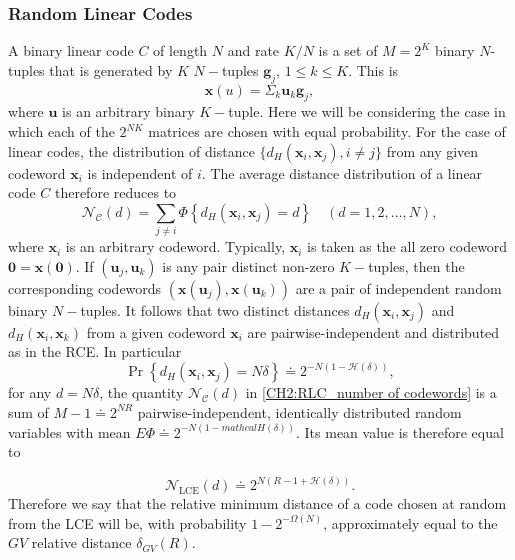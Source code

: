 \subsubsection{Random Linear Codes}
A binary linear code $C$ of length $N$ and rate $K/N$ is a set of $M=2^K$ binary $N$-tuples that is generated by $K$ $N-$tuples $\mathbf{g}_j$, $1\leq k \leq K$. This is
\begin{equation}
\mathbf{x}(u)=\Sigma_k \mathbf{u}_k \mathbf{g}_j,
\end{equation}
where $\mathbf{u}$ is an arbitrary binary $K-$tuple. Here we will be considering the case in which each of the $2^{NK}$ matrices are chosen with equal probability. For the case of linear codes, the distribution of distance $\{d_H(\mathbf{x}_i,\mathbf{x}_j),i\neq j\}$ from any given codeword $\mathbf{x}_i$ is independent of $i$. The average distance distribution of a linear code $C$ therefore reduces to
\begin{equation}
\mathcal{N}_{\mathcal{C}}(d)=\sum_{j \neq i} \Phi\left\{d_{H}\left(\boldsymbol{x}_{i}, \boldsymbol{x}_{j}\right)=d\right\} \quad(d=1,2, \ldots, N),
\label{CH2:RLC_number of codewords}
\end{equation}
where $\mathbf{x}_i$ is an arbitrary codeword. Typically, $\mathbf{x}_i$ is taken as the all zero codeword $\mathbf{0}=\mathbf{x(0)}$. If $(\mathbf{u}_j,\mathbf{u}_k)$ is any pair distinct non-zero $K-$tuples, then the corresponding codewords $(\mathbf{x}(\mathbf{u}_j),\mathbf{x}(\mathbf{u}_k))$ are a pair of independent random binary $N-$tuples. It follows that two distinct distances $d_H(\mathbf{x}_i,\mathbf{x}_j)$ and $d_H(\mathbf{x}_i,\mathbf{x}_k)$ from a given codeword $\mathbf{x}_i$ are pairwise-independent and distributed as in the RCE. In particular 
\begin{equation}
\operatorname{Pr}\left\{d_{H}\left(\boldsymbol{x}_{i}, \boldsymbol{x}_{j}\right)=N \delta\right\} \doteq 2^{-N(1-\mathcal{H}(\delta))},
\end{equation}
for any $d=N\delta$, the quantity $\mathcal{N}_{\mathcal{C}}(d)$ in \eqref{CH2:RLC_number of codewords} is a sum of $M-1\doteq 2^{NR}$ pairwise-independent, identically distributed random variables with mean $E\Phi\doteq 2^{-N(1-mathcal{H}(\delta))}$. Its mean value is therefore equal to

\begin{equation}
\mathcal{N}_{\mathrm{LCE}}(d) \doteq 2^{N(R-1+\mathcal{H}(\delta))}.
\end{equation}
\indent Therefore we say that the relative minimum distance of a code chosen at random from the LCE will be, with probability $1-2^{-\Omega(N)}$, approximately equal to the $GV$ relative distance $\delta_{GV}(R)$.\\

